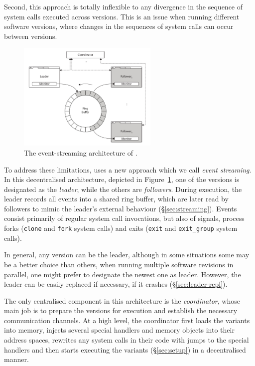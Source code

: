 Second, this approach is totally inflexible to any divergence in the
sequence of system calls executed across versions.  This is an issue
when running different software versions, where changes in the sequences of
system calls can occur between versions. 

\begin{figure}[t]
  \begin{center}
    \includegraphics[width=0.6\textwidth]{efficient-execution/figures/architecture}
    \caption{The event-streaming architecture of \varan.}
    \label{fig:architecture}
  \end{center}
\end{figure}

To address these limitations, \varan uses a new approach which we call
\emph{event streaming}.  In this decentralised architecture,
depicted in Figure~\ref{fig:architecture}, one of the
versions is designated as the \textit{leader}, while the others are
\textit{followers}. During execution, the leader records all events into a
shared ring buffer, which are later read by followers to mimic the leader's
external behaviour (\S\ref{sec:streaming}). Events consist primarily
of regular system
call invocations, but also of signals, process forks (\ie \lstinline`clone`
and \lstinline`fork` system calls) and exits (\ie \lstinline`exit` and
\lstinline`exit_group` system calls).

In general, any version can be the leader, although in some situations
some may be a better choice than others, \eg when running multiple
software revisions in parallel, one might prefer to designate the
newest one as leader.  However, the leader can be easily replaced if
necessary, \eg if it crashes (\S\ref{sec:leader-repl}).

The only centralised component in this architecture is the
\textit{coordinator}, whose main job is to prepare the versions for
execution and establish the necessary communication channels.  At a
high level, the coordinator first loads the variants into memory,
injects several special handlers and memory objects into their address
spaces, rewrites any system calls in their code with jumps to the
special handlers and then starts executing the variants
(\S\ref{sec:setup}) in a decentralised manner.

